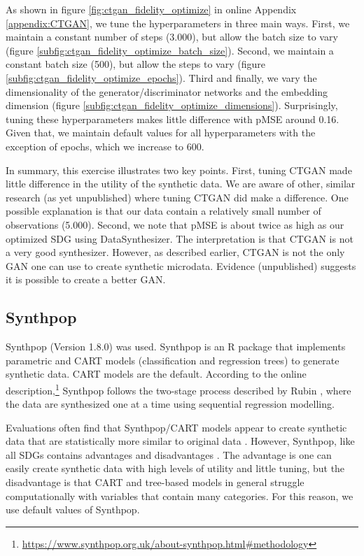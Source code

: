 \documentclass[runningheads]{llncs}
\begin{document}
As shown in figure \ref{fig:ctgan_fidelity_optimize} in online Appendix \ref{appendix:CTGAN}, we tune the hyperparameters in three main ways.  First, we maintain a constant number of steps (3.000), but allow the batch size to vary (figure \ref{subfig:ctgan_fidelity_optimize_batch_size}).  Second, we maintain a constant batch size (500), but allow the steps to vary (figure \ref{subfig:ctgan_fidelity_optimize_epochs}).  Third and finally, we vary the dimensionality of the generator/discriminator networks and the embedding dimension (figure \ref{subfig:ctgan_fidelity_optimize_dimensions}).  Surprisingly, tuning these hyperparameters makes little difference with pMSE around 0.16.  Given that, we maintain default values for all hyperparameters with the exception of epochs, which we increase to 600.

In summary, this exercise illustrates two key points.  First, tuning CTGAN made little difference in the utility of the synthetic data.  We are aware of other, similar research (as yet unpublished) where tuning CTGAN did make a difference.  One possible explanation is that our data contain a relatively small number of observations (5.000).  Second, we note that pMSE is about twice as high as our optimized SDG using DataSynthesizer.  The interpretation is that CTGAN is not a very good synthesizer.  However, as described earlier, CTGAN is not the only GAN one can use to create synthetic microdata.  Evidence (unpublished) suggests it is possible to create a better GAN.

\subsection{Synthpop} 

Synthpop (Version 1.8.0) \cite{nowok2016synthpop} was used. Synthpop is an R package that implements parametric and CART models (classification and regression trees) to generate synthetic data.  CART models are the default.  According to the online description,\footnote{\url{https://www.synthpop.org.uk/about-synthpop.html\#methodology}} Synthpop follows the two-stage process described by Rubin \citep{rubin1993statistical}, where the data are synthesized one at a time using sequential regression modelling.  

Evaluations often find that Synthpop/CART models appear to create synthetic data that are statistically more similar to original data  \cite{little2022comparing,dankar2021fake,drechsler2011empirical}.  However, Synthpop, like all SDGs contains advantages and disadvantages \cite{little2022comparing}.  The advantage is one can easily create synthetic data with high levels of utility and little tuning, but the disadvantage is that CART and tree-based models in general struggle computationally with variables that contain many categories.  For this reason, we use default values of Synthpop.
\end{document}
